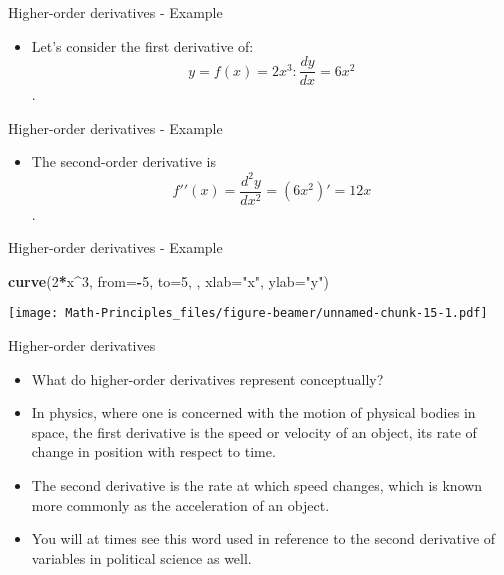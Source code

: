 \documentclass[
  ignorenonframetext,
]{beamer}
\newenvironment{Shaded}{\begin{snugshade}}{\end{snugshade}}
\newcommand{\DataTypeTok}[1]{\textcolor[rgb]{0.13,0.29,0.53}{#1}}
\newcommand{\DecValTok}[1]{\textcolor[rgb]{0.00,0.00,0.81}{#1}}
\newcommand{\KeywordTok}[1]{\textcolor[rgb]{0.13,0.29,0.53}{\textbf{#1}}}
\newcommand{\NormalTok}[1]{#1}
\newcommand{\OperatorTok}[1]{\textcolor[rgb]{0.81,0.36,0.00}{\textbf{#1}}}
\newcommand{\StringTok}[1]{\textcolor[rgb]{0.31,0.60,0.02}{#1}}
\providecommand{\tightlist}{%
  \setlength{\itemsep}{0pt}\setlength{\parskip}{0pt}}
\begin{document}
\begin{frame}{Higher-order derivatives - Example}
\protect\hypertarget{higher-order-derivatives---example}{}

\begin{itemize}
\tightlist
\item
  Let's consider the first derivative of:
  \[y = f (x) = 2x^3: \frac{dy}{dx} = 6x^2\].
\end{itemize}

\end{frame}

\begin{frame}{Higher-order derivatives - Example}
\protect\hypertarget{higher-order-derivatives---example-1}{}

\begin{itemize}
\tightlist
\item
  The second-order derivative is
  \[f′′(x) = \frac{d^{2}y}{dx^{2}} = (6x^2)′ = 12x\].
\end{itemize}

\end{frame}

\begin{frame}[fragile]{Higher-order derivatives - Example}
\protect\hypertarget{higher-order-derivatives---example-2}{}

\begin{Shaded}
\begin{Highlighting}[]
\KeywordTok{curve}\NormalTok{(}\DecValTok{2}\OperatorTok{*}\NormalTok{x}\OperatorTok{^}\DecValTok{3}\NormalTok{, }\DataTypeTok{from=}\OperatorTok{-}\DecValTok{5}\NormalTok{, }\DataTypeTok{to=}\DecValTok{5}\NormalTok{, , }\DataTypeTok{xlab=}\StringTok{"x"}\NormalTok{, }\DataTypeTok{ylab=}\StringTok{"y"}\NormalTok{)}
\end{Highlighting}
\end{Shaded}

\texttt{[image: Math-Principles\_files/figure-beamer/unnamed-chunk-15-1.pdf]}

\end{frame}

\begin{frame}{Higher-order derivatives}
\protect\hypertarget{higher-order-derivatives-1}{}

\begin{itemize}
\item
  What do higher-order derivatives represent conceptually?
\item
  In physics, where one is concerned with the motion of physical bodies
  in space, the first derivative is the speed or velocity of an object,
  its rate of change in position with respect to time.
\item
  The second derivative is the rate at which speed changes, which is
  known more commonly as the acceleration of an object.
\item
  You will at times see this word used in reference to the second
  derivative of variables in political science as well.
\end{itemize}

\end{frame}
\end{document}
